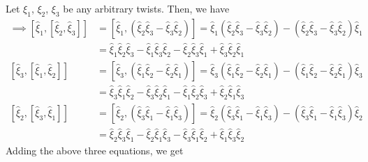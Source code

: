 Let \( \xi_{1} \), \( \xi_{2} \), \( \xi_{3} \) be any arbitrary twists.
Then, we have
\begin{align*}
    \implies
    \left[\widehat{\xi}_{1},\left[\widehat{\xi}_{2}, \widehat{\xi}_{3}\right]\right]
     & =
    \left[\widehat{\xi}_{1},(\widehat{\xi}_{2} \widehat{\xi}_{3}-\widehat{\xi}_{3} \widehat{\xi}_{2})\right]
    =
    \widehat{\xi}_{1} (\widehat{\xi}_{2} \widehat{\xi}_{3}-\widehat{\xi}_{3} \widehat{\xi}_{2})-(\widehat{\xi}_{2} \widehat{\xi}_{3}-\widehat{\xi}_{3} \widehat{\xi}_{2}) \widehat{\xi}_{1}
    \\ & =
    \widehat{\xi}_{1} \widehat{\xi}_{2} \widehat{\xi}_{3}-\widehat{\xi}_{1} \widehat{\xi}_{3} \widehat{\xi}_{2}-\widehat{\xi}_{2} \widehat{\xi}_{3} \widehat{\xi}_{1}+\widehat{\xi}_{3} \widehat{\xi}_{2} \widehat{\xi}_{1}
    \\
    \left[\widehat{\xi}_{3},\left[\widehat{\xi}_{1}, \widehat{\xi}_{2}\right]\right]
     & =
    \left[\widehat{\xi}_{3},(\widehat{\xi}_{1} \widehat{\xi}_{2}-\widehat{\xi}_{2} \widehat{\xi}_{1})\right]
    =
    \widehat{\xi}_{3} (\widehat{\xi}_{1} \widehat{\xi}_{2}-\widehat{\xi}_{2} \widehat{\xi}_{1})-(\widehat{\xi}_{1} \widehat{\xi}_{2}-\widehat{\xi}_{2} \widehat{\xi}_{1}) \widehat{\xi}_{3}
    \\ & =
    \widehat{\xi}_{3} \widehat{\xi}_{1} \widehat{\xi}_{2}-\widehat{\xi}_{3} \widehat{\xi}_{2} \widehat{\xi}_{1}-\widehat{\xi}_{1} \widehat{\xi}_{2} \widehat{\xi}_{3}+\widehat{\xi}_{2} \widehat{\xi}_{1} \widehat{\xi}_{3}
    \\
    \left[\widehat{\xi}_{2},\left[\widehat{\xi}_{3}, \widehat{\xi}_{1}\right]\right]
     & =
    \left[\widehat{\xi}_{2},(\widehat{\xi}_{3} \widehat{\xi}_{1}-\widehat{\xi}_{1} \widehat{\xi}_{3})\right]
    =
    \widehat{\xi}_{2} (\widehat{\xi}_{3} \widehat{\xi}_{1}-\widehat{\xi}_{1} \widehat{\xi}_{3})-(\widehat{\xi}_{3} \widehat{\xi}_{1}-\widehat{\xi}_{1} \widehat{\xi}_{3}) \widehat{\xi}_{2}
    \\ & =
    \widehat{\xi}_{2} \widehat{\xi}_{3} \widehat{\xi}_{1}-\widehat{\xi}_{2} \widehat{\xi}_{1} \widehat{\xi}_{3}-\widehat{\xi}_{3} \widehat{\xi}_{1} \widehat{\xi}_{2}+\widehat{\xi}_{1} \widehat{\xi}_{3} \widehat{\xi}_{2}
\end{align*}
Adding the above three equations, we get
